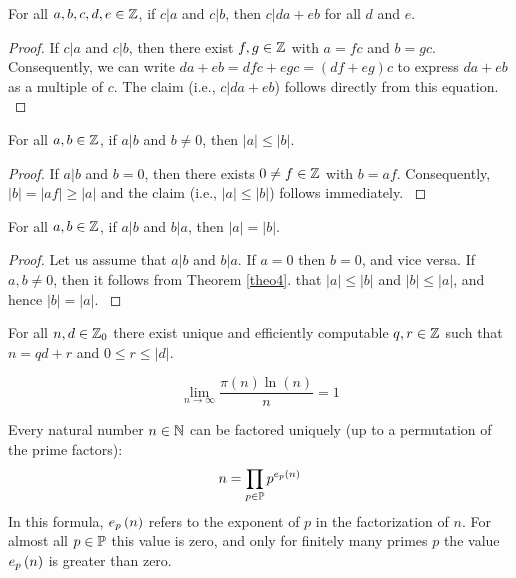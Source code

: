 \begin{theo}
For all $a,b,c,d,e\in\mathbb{Z}$, if $c|a$ and $c|b$, then $c|da+eb$ for all $d$ and $e$.
\begin{proof}
If $c|a$ and $c|b$, then there exist $f,g\in\mathbb{Z}$ with $a=fc$ and $b=gc$. Consequently, we can write $da+eb=dfc+egc=\left(df+eg\right)c$ to express $da+eb$ as a multiple of $c$. The claim (i.e., $c|da+eb$) follows directly from this equation.
\cite{Oppliger:2011:CC:2049860}
\end{proof}
\end{theo}

\begin{theo}
\label{theo4}
For all $a,b\in\mathbb{Z}$, if $a|b$ and $b\neq0$, then $\left|a\right|\leq\left|b\right|$.
\begin{proof}
If $a|b$ and $b=0$, then there exists $0\neq f\in\mathbb{Z}$ with $b=af$. Consequently, $\left|b\right|=\left|af\right|\geq\left|a\right|$ and the claim (i.e., $\left|a\right|\leq\left|b\right|$) follows immediately.
\cite{Oppliger:2011:CC:2049860}
\end{proof}
\end{theo}

\begin{theo}
For all $a,b\in\mathbb{Z}$, if $a|b$ and $b|a$, then $\left|a\right|=\left|b\right|$.
\begin{proof}
Let us assume that $a|b$ and $b|a$. If $a=0$ then $b=0$, and vice versa. If $a,b\neq 0$, then it follows from Theorem \ref{theo4}. that $\left|a\right|\leq\left|b\right|$ and $\left|b\right|\leq\left|a\right|$, and hence $\left|b\right|=\left|a\right|$.
\cite{Oppliger:2011:CC:2049860}
\end{proof}
\end{theo}

\begin{theo}
For all $n,d\in\mathbb{Z}_0$ there exist unique and efficiently computable $q,r\in\mathbb{Z}$ such that $n=qd+r$ and $0\leq r\leq\left|d\right|$.
\cite{Oppliger:2011:CC:2049860}
\end{theo}

\begin{theo}
\begin{equation}
\displaystyle\lim_{n\rightarrow\infty}\displaystyle\frac{\pi\left(n\right)\ln\left(n\right)}{n}=1
\end{equation}
\cite{Oppliger:2011:CC:2049860}
\end{theo}

\begin{theo}
Every natural number $n\in\mathbb{N}$ can be factored uniquely (up to a permutation of the prime factors):
\begin{equation}
n=\displaystyle\prod_{p\in\mathbb{P}}{p^{e_p\left(n\right)}}
\end{equation}
In this formula, $e_p\left(n\right)$ refers to the exponent of $p$ in the factorization of $n$. For almost all $p\in\mathbb{P}$ this value is zero, and only for finitely many primes $p$ the value $e_p\left(n\right)$ is greater than zero.
\cite{Oppliger:2011:CC:2049860}
\end{theo}

